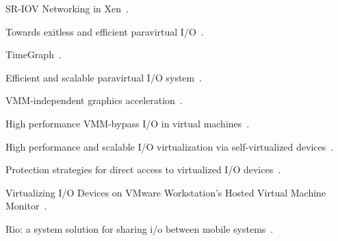 \begin{compactitem}
\item SR-IOV Networking in Xen~\cite{Dong:2008:SNX:1855865.1855875}.
\item Towards exitless and efficient paravirtual I/O~\cite{exitless-paravirtual-io}.
\item TimeGraph~\cite{kato2011timegraph}.
\item Efficient and scalable paravirtual I/O system~\cite{harel-efficient13atc}.
\item VMM-independent graphics acceleration~\cite{vmm-independent-gfx-vee07}.
\item High performance VMM-bypass I/O in virtual machines~\cite{vmm-bypass-atc06}.
\item High performance and scalable I/O virtualization via self-virtualized devices~\cite{self-virt-hpdc07}.
\item Protection strategies for direct access to virtualized I/O devices~\cite{direct-access-virt-io-atc08}.
\item Virtualizing I/O Devices on VMware Workstation's Hosted Virtual Machine Monitor~\cite{vmware-hosted-io-atc01}.
\item Rio: a system solution for sharing i/o between mobile systems~\cite{AmiriSani:2014:RSS:2594368.2594370}.
\end{compactitem}
